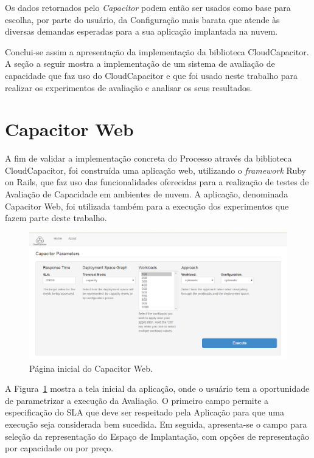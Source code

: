 Os dados retornados pelo \emph{Capacitor} podem então ser usados como base para escolha, por parte do usuário,
da Configuração mais barata que atende às diversas demandas esperadas para a 
sua aplicação implantada na nuvem.

Conclui-se assim a apresentação da implementação da biblioteca CloudCapacitor. A
seção a seguir mostra a implementação de um sistema de avaliação de capacidade 
que faz uso do CloudCapacitor e que foi usado neste trabalho para realizar os
experimentos de avaliação e analisar os seus resultados.

\section{Capacitor Web}
A fim de validar a implementação concreta do Processo através da biblioteca
CloudCapacitor, foi construída uma aplicação web, utilizando o \emph{framework} Ruby on Rails, que faz uso das funcionalidades oferecidas para a realização de testes de Avaliação de Capacidade em ambientes
de nuvem. A aplicação, denominada Capacitor Web, foi utilizada também
para a execução dos experimentos que fazem parte deste trabalho.

\begin{figure}[t]
  \begin{center}
    \includegraphics[width=\linewidth]{img/CapacitorWeb_Frontpage}
  \end{center}
  \caption{\label{fig:capacitor_web_front}Página inicial do Capacitor Web.}
\end{figure}

A Figura~\ref{fig:capacitor_web_front} mostra a tela inicial da aplicação, onde
o usuário tem a oportunidade de parametrizar a execução da Avaliação. O primeiro
campo permite a especificação do SLA que deve ser respeitado pela Aplicação para
que uma execução seja considerada bem sucedida. Em seguida, apresenta-se o campo
para seleção da representação do Espaço de Implantação, com opções de representação
por capacidade ou por preço.

